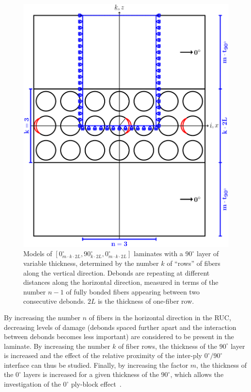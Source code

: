 \documentclass[review]{elsarticle}
\begin{document}
\begin{figure}[!h]
\centering
        \includegraphics[width=\textwidth]{ThickPly.pdf}
\caption{Models of $\left[0_{m\cdot k\cdot2L}^{\circ},90_{k\cdot2L}^{\circ},0_{m\cdot k\cdot2L}^{\circ}\right]$ laminates with a $90^{\circ}$ layer of variable thickness, determined by the number $k$ of ``rows'' of fibers along the vertical direction.  Debonds are repeating at different distances along the horizontal direction, measured in terms of the number $n-1$ of fully bonded fibers appearing between two consecutive debonds. $2L$ is the thickness of one-fiber row.}\label{fig:laminateModelsB}
\end{figure}

By increasing the number $n$ of fibers in the horizontal direction in the RUC, decreasing levels of damage (debonds spaced further apart and the interaction between debonds becomes less important) are considered to be present in the laminate. By increasing the number $k$ of fiber rows, the thickness of the $90^{\circ}$ layer is increased and the effect of the relative proximity of the inter-ply $0^{\circ}/90^{\circ}$ interface can thus be studied. Finally, by increasing the factor $m$, the thickness of the $0^{\circ}$ layers is increased for a given thickness of the $90^{\circ}$, which allows the investigation of the $0^{\circ}$ ply-block effect~\cite{Teixeira2016}.
\end{document}

